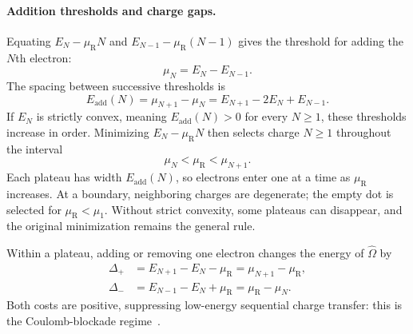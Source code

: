 \paragraph{Addition thresholds and charge gaps.}
Equating $E_N-\mu_{\mathrm R}N$ and
$E_{N-1}-\mu_{\mathrm R}(N-1)$ gives the threshold for adding
the $N$th electron:
\begin{equation}
  \mu_N=E_N-E_{N-1}.
  \label{eq:dot-addition-threshold}
\end{equation}
The spacing between successive thresholds is
\begin{equation}
  E_{\mathrm{add}}(N)=\mu_{N+1}-\mu_N
       =E_{N+1}-2E_N+E_{N-1}.
  \label{eq:dot-addition-energy-spacing}
\end{equation}
If $E_N$ is strictly convex, meaning $E_{\mathrm{add}}(N)>0$
for every $N\geq1$, these thresholds increase in order.
Minimizing $E_N-\mu_{\mathrm R}N$ then selects charge $N\geq1$
throughout the interval
\begin{equation}
  \mu_N<\mu_{\mathrm R}<\mu_{N+1}.
  \label{eq:dot-charge-stability-window}
\end{equation}
Each plateau has width $E_{\mathrm{add}}(N)$, so electrons enter
one at a time as $\mu_{\mathrm R}$ increases. At a boundary,
neighboring charges are degenerate; the empty dot is selected
for $\mu_{\mathrm R}<\mu_1$. Without strict convexity, some
plateaus can disappear, and the original minimization remains
the general rule.

Within a plateau, adding or removing one electron changes
the energy of $\widehat{\Omega}$ by
\begin{align}
  \Delta_+&=E_{N+1}-E_N-\mu_{\mathrm R}
             =\mu_{N+1}-\mu_{\mathrm R},\\
  \Delta_-&=E_{N-1}-E_N+\mu_{\mathrm R}
             =\mu_{\mathrm R}-\mu_N.
  \label{eq:dot-charge-transfer-costs}
\end{align}
Both costs are positive, suppressing low-energy sequential
charge transfer: this is the Coulomb-blockade regime~\cite{Beenakker1991}.

